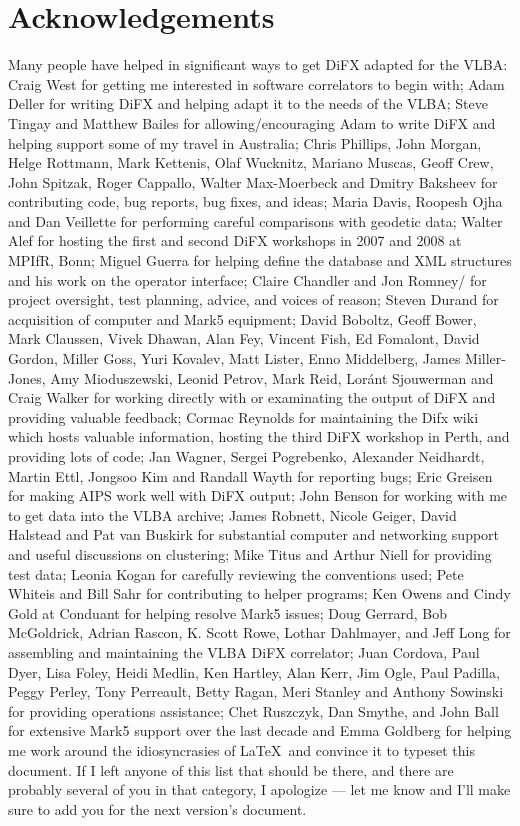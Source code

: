 \section{Acknowledgements}

Many people have helped in significant ways to get DiFX adapted for the VLBA:
Craig West for getting me interested in software correlators to begin with; 
Adam Deller for writing DiFX and helping adapt it to the needs of the VLBA; 
Steve Tingay and Matthew Bailes for allowing/encouraging Adam to write DiFX and helping support some of my travel in Australia;
Chris Phillips, John Morgan, Helge Rottmann, Mark Kettenis, Olaf Wucknitz, Mariano Muscas, Geoff Crew, John Spitzak, Roger Cappallo, Walter Max-Moerbeck and Dmitry Baksheev for contributing code, bug reports, bug fixes, and ideas;
Maria Davis, Roopesh Ojha and Dan Veillette for performing careful comparisons with geodetic data;
Walter Alef for hosting the first and second DiFX workshops in 2007 and 2008 at MPIfR, Bonn;
Miguel Guerra for helping define the database and XML structures and his work on the operator interface;
Claire Chandler and Jon Romney/ for project oversight, test planning, advice, and voices of reason;
Steven Durand for acquisition of computer and Mark5 equipment;
David Boboltz, Geoff Bower, Mark Claussen, Vivek Dhawan, Alan Fey, Vincent Fish, Ed Fomalont, David Gordon, Miller Goss, Yuri Kovalev, Matt Lister, Enno Middelberg, James Miller-Jones, Amy Mioduszewski, Leonid Petrov, Mark Reid, Lor\'{a}nt Sjouwerman and Craig Walker for working directly with or examinating the output of DiFX and providing valuable feedback;
Cormac Reynolds for maintaining the Difx wiki which hosts valuable information, hosting the third DiFX workshop in Perth, and providing lots of code;
Jan Wagner, Sergei Pogrebenko, Alexander Neidhardt, Martin Ettl, Jongsoo Kim and Randall Wayth for reporting bugs;
Eric Greisen for making AIPS work well with DiFX output;
John Benson for working with me to get data into the VLBA archive;
James Robnett, Nicole Geiger, David Halstead and Pat van Buskirk for substantial computer and networking support and useful discussions on clustering;
Mike Titus and Arthur Niell for providing test data;
Leonia Kogan for carefully reviewing the conventions used;
Pete Whiteis and Bill Sahr for contributing to helper programs;
Ken Owens and Cindy Gold at Conduant for helping resolve Mark5 issues;
Doug Gerrard, Bob McGoldrick, Adrian Rascon, K. Scott Rowe, Lothar Dahlmayer, and Jeff Long for assembling and maintaining the VLBA DiFX correlator;
Juan Cordova, Paul Dyer, Lisa Foley, Heidi Medlin, Ken Hartley, Alan Kerr, Jim Ogle, Paul Padilla, Peggy Perley, Tony Perreault, Betty Ragan, Meri Stanley and Anthony Sowinski for providing operations assistance;
Chet Ruszczyk, Dan Smythe, and John Ball for extensive Mark5 support over the last decade
and
Emma Goldberg for helping me work around the idiosyncrasies of \LaTeX \ and convince it to typeset this document.
If I left anyone of this list that should be there, and there are probably several of you in that category, I apologize --- let me know and I'll make sure to add you for the next version's document.


